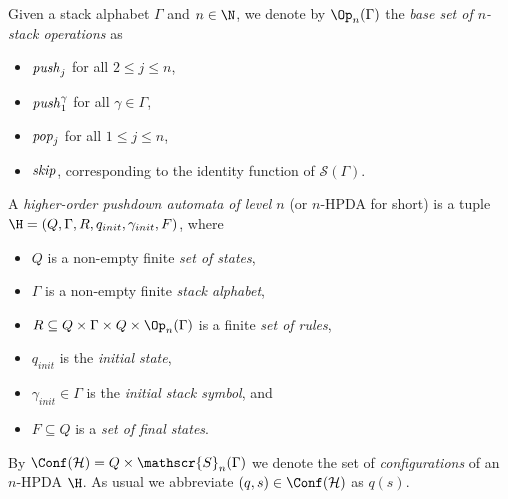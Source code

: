 Given a stack alphabet $\Gamma$ and $n \in \N$, 
we denote by  $\Op_n(\Gamma)$ the {\em base set of $n$-stack operations} as

\begin{itemize}
\item $\text{\textit{push}}_j$ for all $2 \leq j \leq n$,

\item $\text{\textit{push}}_1^\gamma$ for all $\gamma \in \Gamma$,

\item $\text{\textit{pop}}_j$ for all $1 \leq j \leq n$,

\item $\text{\textit{skip}}$, corresponding to the identity function of $\mathscr{S}(\Gamma)$.

\end{itemize}




\begin{samepage}
\par\noindent\ignorespacesafterend
A {\em higher-order pushdown automata of level $n$} (or $n$-HPDA for short) 
is a tuple $\H=(Q, \Gamma, R, q_{init}, \gamma_{init}, F)$,
where 
\begin{itemize}
        \item $Q$ is a non-empty finite {\em set of  states},
        \item $\Gamma$ is a non-empty finite {\em  stack alphabet},
	\item $R\subseteq Q\times \Gamma \times Q \times \Op_n(\Gamma)$ is a finite {\em set of  rules},
        \item $q_{init}$ is the {\em initial  state},
        \item $\gamma_{init} \in \Gamma$ is the {\em %
initial stack symbol}, and
	\item $F\subseteq Q$ is a {\em set of final  states}.
		\end{itemize}
\end{samepage}

\par\noindent\ignorespacesafterend
By $\Conf(\mathcal{H}) = Q \times \mathscr{S}_n(\Gamma)$
we denote the set of {\em configurations} of an $n$-HPDA $\H$. 
As usual we abbreviate $(q,s) \in \Conf(\mathcal{H})$ as $q(s)$.



